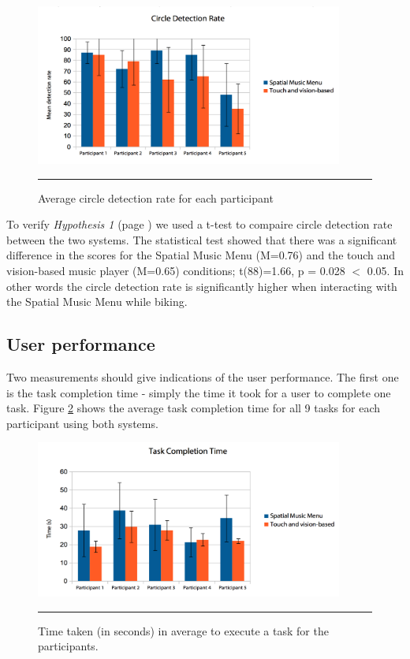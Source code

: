 \begin{figure}[h]
	\centering
		\includegraphics[width=0.9\textwidth,height=\textheight,keepaspectratio]{./Figures/results_circledetections.png}
		\rule{35em}{1pt}
	\caption[Results Circle Detection Rate]{Average circle detection rate for each participant}
	\label{fig:resultscircles}
\end{figure}

To verify \textit{Hypothesis 1} (page \pageref{sec:evaluationhypothesis}) we used a t-test to compaire circle detection rate between the two systems. The statistical test showed that there was a significant difference in the scores for the Spatial Music Menu (M=0.76) and the touch and vision-based music player (M=0.65) conditions; t(88)=1.66, p = 0.028 $<$ 0.05. In other words the circle detection rate is significantly higher when interacting with the Spatial Music Menu while biking.

\subsection{User performance}
Two measurements should give indications of the user performance. The first one is the task completion time - simply the time it took for a user to complete one task. Figure \ref{fig:resultstasktime} shows the average task completion time for all 9 tasks for each participant using both systems.

\begin{figure}[h]
	\centering
		\includegraphics[width=0.9\textwidth,height=\textheight,keepaspectratio]{./Figures/results_tasktime.png}
		\rule{35em}{1pt}
	\caption[Results task time]{Time taken (in seconds) in average to execute a task for the participants.}
	\label{fig:resultstasktime}
\end{figure}

